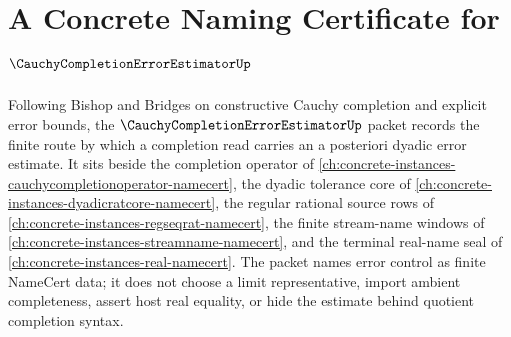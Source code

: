 \chapter{A Concrete Naming Certificate for $\CauchyCompletionErrorEstimatorUp$}
\label{ch:concrete-instances-cauchy-completion-error-estimator-namecert}

Following Bishop and Bridges on constructive Cauchy completion and explicit error bounds, the $\CauchyCompletionErrorEstimatorUp$ packet records the finite route by which a completion read carries an a posteriori dyadic error estimate. It sits beside the completion operator of \autoref{ch:concrete-instances-cauchycompletionoperator-namecert}, the dyadic tolerance core of \autoref{ch:concrete-instances-dyadicratcore-namecert}, the regular rational source rows of \autoref{ch:concrete-instances-regseqrat-namecert}, the finite stream-name windows of \autoref{ch:concrete-instances-streamname-namecert}, and the terminal real-name seal of \autoref{ch:concrete-instances-real-namecert}. The packet names error control as finite NameCert data; it does not choose a limit representative, import ambient completeness, assert host real equality, or hide the estimate behind quotient completion syntax.

